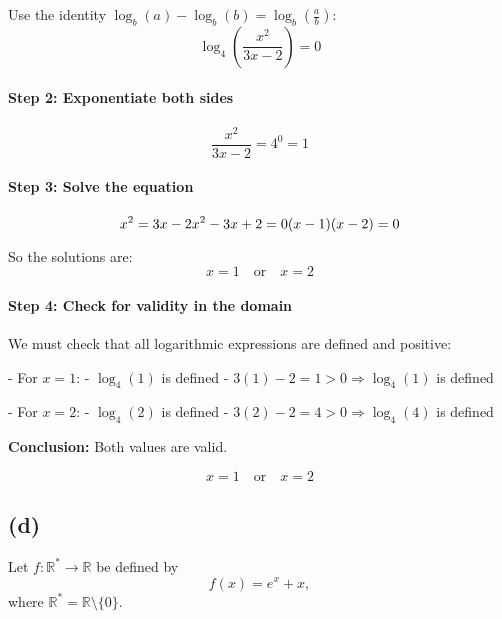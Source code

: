 \documentclass{article}
\begin{document}
Use the identity \( \log_b(a) - \log_b(b) = \log_b\left(\frac{a}{b}\right) \):
\[
\log_4\left( \frac{x^2}{3x - 2} \right) = 0
\]

\paragraph{Step 2: Exponentiate both sides}

\[
\frac{x^2}{3x - 2} = 4^0 = 1
\]

\paragraph{Step 3: Solve the equation}

\[
x^2 = 3x - 2 \\
x^2 - 3x + 2 = 0 \\
(x - 1)(x - 2) = 0
\]

So the solutions are:
\[
x = 1 \quad \text{or} \quad x = 2
\]

\paragraph{Step 4: Check for validity in the domain}

We must check that all logarithmic expressions are defined and positive:

- For \( x = 1 \):
  - \( \log_4(1) \) is defined
  - \( 3(1) - 2 = 1 > 0 \Rightarrow \log_4(1) \) is defined

- For \( x = 2 \):
  - \( \log_4(2) \) is defined
  - \( 3(2) - 2 = 4 > 0 \Rightarrow \log_4(4) \) is defined

\textbf{Conclusion:} Both values are valid.

\[
\boxed{x = 1 \quad \text{or} \quad x = 2}
\]

\subsection*{(d)}

Let \( f : \mathbb{R}^* \to \mathbb{R} \) be defined by
\[
f(x) = e^x + x,
\]
where \( \mathbb{R}^* = \mathbb{R} \setminus \{0\} \).
\end{document}
